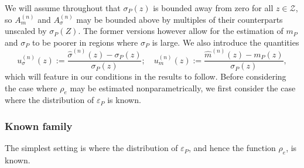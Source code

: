 \documentclass[aos]{imsart}
\newcommand{\E}{\mathbb{E}}
\begin{document}
We will assume throughout that $\sigma_P(z)$ is bounded away from zero for all $z \in \mathcal{Z}$, so $	A_m^{(n)}$ and $A_\sigma^{(n)}$ may be bounded above by multiples of their counterparts unscaled by $\sigma_P(Z)$. The former versions however allow for the estimation of $m_P$ and $\sigma_P$ to be poorer in regions where $\sigma_P$ is large. We also introduce the quantities
	\begin{equation*}
	u^{(n)}_\sigma(z) := \frac{\hat \sigma^{(n)}(z) - \sigma_P(z)}{\sigma_P(z)};\quad 
	u^{(n)}_m(z) := \frac{\hat m^{(n)}(z) - m_P(z)}{\sigma_P(z)},
\end{equation*}
which will feature in our conditions in the results to follow. Before considering the case where $\rho_{e}$ may be estimated nonparametrically, we first consider the case where the distribution of $\varepsilon_P$ is known.
	
	
	
	
	\subsubsection{Known family}
	
	The simplest setting is where the distribution of $\varepsilon_P$, and hence the function $\rho_{e}$, is known.
	
\end{document}
